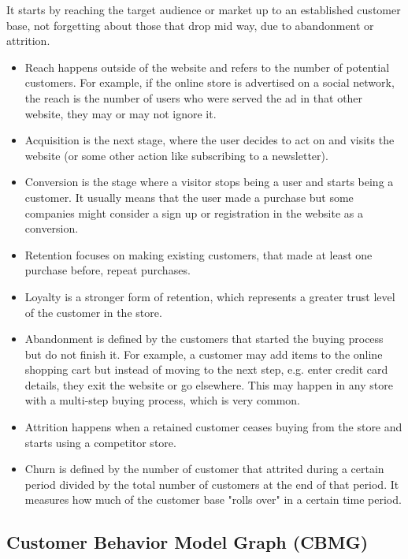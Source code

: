 It starts by reaching the target audience or market up to an established 
customer base, not forgetting about those that drop mid way, due to abandonment 
or attrition.

\begin{itemize}
    \item Reach happens outside of the website and refers to the number of 
    potential customers. For example, if the online store is advertised on a 
    social network, the reach is the number of users who were served the ad in 
    that other website, they may or may not ignore it.
    \item Acquisition is the next stage, where the user decides to act on and 
    visits the website (or some other action like subscribing to a newsletter).
    \item Conversion is the stage where a visitor stops being a user and starts 
    being a customer. It usually means that the user made a purchase but some 
    companies might consider a sign up or registration in the website as a 
    conversion.
    \item Retention focuses on making existing customers, that made at least 
    one purchase before, repeat purchases.
    \item Loyalty is a stronger form of retention, which represents a greater 
    trust level of the customer in the store.
    \item Abandonment is defined by the customers that started the buying 
    process but do not finish it. For example, a customer may add items to the 
    online shopping cart but instead of moving to the next step, e.g. enter 
    credit card details, they exit the website or go elsewhere. This may happen 
    in any store with a multi-step buying process, which is very common.
    \item Attrition happens when a retained customer ceases buying from the 
    store and starts using a competitor store.
    \item Churn is defined by the number of customer that attrited during a 
    certain period divided by the total number of customers at the end of that 
    period. It measures how much of the customer base "rolls over" in a certain 
    time period.
\end{itemize}

\subsection{Customer Behavior Model Graph (CBMG)}

